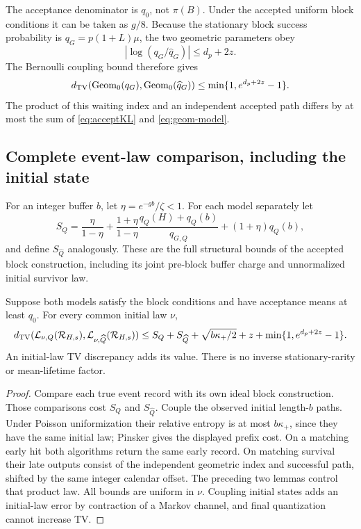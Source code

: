The acceptance denominator is $q_0$, not $\pi(B)$. Under the accepted
uniform block conditions it can be taken as $g/8$.
Because the stationary block success probability is
$q_G=p(1+L)\mu$, the two geometric parameters obey
\begin{equation}
|\log(q_G/\widehat q_G)|\le d_p+2z.
\end{equation}
The Bernoulli coupling bound therefore gives
\begin{equation}
d_{\rm TV}(\operatorname{Geom}_0(q_G),
    \operatorname{Geom}_0(\widehat q_G))
\le\min\{1,e^{d_p+2z}-1\}.
\label{eq:geom-model}
\end{equation}
The product of this waiting index and an independent accepted path
differs by at most the sum of \eqref{eq:acceptKL} and
\eqref{eq:geom-model}.

\subsection{Complete event-law comparison, including the initial state}
For an integer buffer $b$, let $\eta=e^{-gb}/\zeta<1$.
For each model separately let
\begin{equation}
S_Q=\frac{\eta}{1-\eta}
+\frac{1+\eta}{1-\eta}\frac{q_Q(H)+q_Q(b)}{q_{G,Q}}
+(1+\eta)q_Q(b),
\label{eq:SQ}
\end{equation}
and define $S_{\widehat Q}$ analogously. These are the full structural
bounds of the accepted block construction, including its joint
pre-block buffer charge and unnormalized initial survivor law.

\begin{theorem}\label{thm:stability}
Suppose both models satisfy the block conditions and have acceptance
means at least $q_0$. For every common initial law $\nu$,
\begin{equation}
d_{\rm TV}(\mathcal L_{\nu,Q}(\mathcal R_{H,s}),
    \mathcal L_{\nu,\widehat Q}(\mathcal R_{H,s}))
\le
S_Q+S_{\widehat Q}
+\sqrt{b\kappa_+/2}
+z+\min\{1,e^{d_p+2z}-1\}.
\label{eq:master}
\end{equation}
An initial-law TV discrepancy adds its value. There is no inverse
stationary-rarity or mean-lifetime factor.
\end{theorem}
\begin{proof}
Compare each true event record with its own ideal block construction.
Those comparisons cost $S_Q$ and $S_{\widehat Q}$. Couple the observed
initial length-$b$ paths. Under Poisson uniformization their relative
entropy is at most $b\kappa_+$, since they have the same initial law;
Pinsker gives the displayed prefix cost. On a matching early hit both
algorithms return the same early record. On matching survival their late
outputs consist of the independent geometric index and successful path,
shifted by the same integer calendar offset. The preceding two lemmas
control that product law. All bounds are uniform in $\nu$. Coupling
initial states adds an initial-law error by contraction of a Markov
channel, and final quantization cannot increase TV.
\end{proof}

